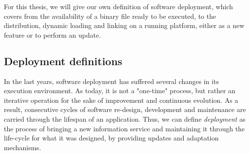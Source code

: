 For this thesis, we will give our own definition of software deployment, which covers from the availability of a binary file ready to be executed, to the distribution, dynamic loading and linking on a running platform, either as a new feature or to perform an update.







\subsection*{Deployment definitions}
In the last years, software deployment has suffered several changes in its execution environment.
As today, it is not a "one-time" process, but rather an iterative operation for the sake of improvement and continuous evolution.
As a result, consecutive cycles of software re-design, development and maintenance are carried through the lifespan of an application.
Thus, we can define \textit{deployment} as the process of bringing a new information service and maintaining it through the life-cycle for what it was designed, by providing updates and adaptation mechanisms.

